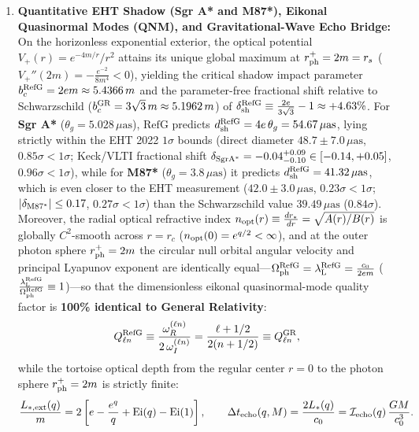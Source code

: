 \documentclass[11pt,a4paper]{article}
\newcommand{\RefG}{\mathrm{RefG}}
\begin{document}
\begin{enumerate}[label=\arabic*.]
\item \textbf{Quantitative EHT Shadow (Sgr A* and M87*), Eikonal Quasinormal Modes (QNM), and Gravitational-Wave Echo Bridge:} On the horizonless exponential exterior, the optical potential $V_+(r) = e^{-4m/r}/r^2$ attains its unique global maximum at $r_{\rm ph}^+ = 2m = r_s$ ($V_+''(2m) = -\frac{e^{-2}}{8 m^4} < 0$), yielding the critical shadow impact parameter $b_c^{\rm RefG} = 2 e m \approx 5.4366\,m$ and the parameter-free fractional shift relative to Schwarzschild ($b_c^{\rm GR} = 3\sqrt{3}\,m \approx 5.1962\,m$) of $\delta_{\rm sh}^{\rm RefG} \equiv \frac{2e}{3\sqrt{3}} - 1 \approx +4.63\%$. For \textbf{Sgr A*} ($\theta_g = 5.028\,\mu\text{as}$), $\RefG$ predicts $d_{\rm sh}^{\rm RefG} = 4e\,\theta_g = 54.67\,\mu\text{as}$, lying strictly within the EHT 2022 $1\sigma$ bounds (direct diameter $48.7 \pm 7.0\,\mu\text{as}$, $0.85\sigma < 1\sigma$; Keck/VLTI fractional shift $\delta_{\rm Sgr A^*} = -0.04^{+0.09}_{-0.10} \in [-0.14, +0.05]$, $0.96\sigma < 1\sigma$), while for \textbf{M87*} ($\theta_g = 3.8\,\mu\text{as}$) it predicts $d_{\rm sh}^{\rm RefG} = 41.32\,\mu\text{as}$, which is even closer to the EHT measurement ($42.0 \pm 3.0\,\mu\text{as}$, $0.23\sigma < 1\sigma$; $|\delta_{\rm M87^*}| \le 0.17$, $0.27\sigma < 1\sigma$) than the Schwarzschild value $39.49\,\mu\text{as}$ ($0.84\sigma$). Moreover, the radial optical refractive index $n_{\rm opt}(r) \equiv \frac{dr_*}{dr} = \sqrt{A(r)/B(r)}$ is globally $C^2$-smooth across $r = r_c$ ($n_{\rm opt}(0) = e^{q/2} < \infty$), and at the outer photon sphere $r_{\rm ph}^+ = 2m$ the circular null orbital angular velocity and principal Lyapunov exponent are identically equal---$\Omega_{\rm ph}^{\rm RefG} = \lambda_{\rm L}^{\rm RefG} = \frac{c_0}{2 e m}$ ($\frac{\lambda_{\rm L}^{\rm RefG}}{\Omega_{\rm ph}^{\rm RefG}} \equiv 1$)---so that the dimensionless eikonal quasinormal-mode quality factor is \textbf{100\% identical to General Relativity}:
\begin{equation}
Q_{\ell n}^{\rm RefG} \equiv \frac{\omega_R^{(\ell n)}}{2\,\omega_I^{(\ell n)}} = \frac{\ell + 1/2}{2(n + 1/2)} \equiv Q_{\ell n}^{\rm GR},
\end{equation}
while the tortoise optical depth from the regular center $r = 0$ to the photon sphere $r_{\rm ph}^+ = 2m$ is strictly finite:
\begin{equation}
\frac{L_{*,\rm ext}(q)}{m} = 2\left[e - \frac{e^q}{q} + \operatorname{Ei}(q) - \operatorname{Ei}(1)\right], \qquad \Delta t_{\rm echo}(q, M) = \frac{2 L_*(q)}{c_0} = \mathcal{I}_{\rm echo}(q)\,\frac{G M}{c_0^3}.

\end{equation}
\end{enumerate}
\end{document}
